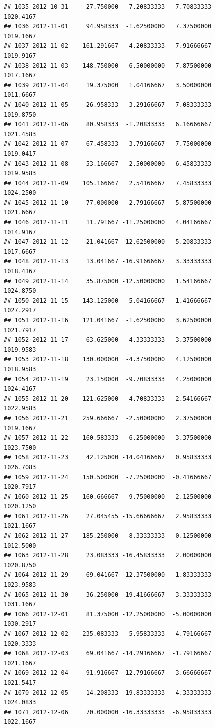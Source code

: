\documentclass[
]{article}
\begin{document}
\begin{verbatim}
## 1035 2012-10-31     27.750000  -7.20833333   7.70833333    1020.4167
## 1036 2012-11-01     94.958333  -1.62500000   7.37500000    1019.1667
## 1037 2012-11-02    161.291667   4.20833333   7.91666667    1019.9167
## 1038 2012-11-03    148.750000   6.50000000   7.87500000    1017.1667
## 1039 2012-11-04     19.375000   1.04166667   3.50000000    1011.6667
## 1040 2012-11-05     26.958333  -3.29166667   7.08333333    1019.8750
## 1041 2012-11-06     80.958333  -1.20833333   6.16666667    1021.4583
## 1042 2012-11-07     67.458333  -3.79166667   7.75000000    1019.0417
## 1043 2012-11-08     53.166667  -2.50000000   6.45833333    1019.9583
## 1044 2012-11-09    105.166667   2.54166667   7.45833333    1024.2500
## 1045 2012-11-10     77.000000   2.79166667   5.87500000    1021.6667
## 1046 2012-11-11     11.791667 -11.25000000   4.04166667    1014.9167
## 1047 2012-11-12     21.041667 -12.62500000   5.20833333    1017.6667
## 1048 2012-11-13     13.041667 -16.91666667   3.33333333    1018.4167
## 1049 2012-11-14     35.875000 -12.50000000   1.54166667    1024.8750
## 1050 2012-11-15    143.125000  -5.04166667   1.41666667    1027.2917
## 1051 2012-11-16    121.041667  -1.62500000   3.62500000    1021.7917
## 1052 2012-11-17     63.625000  -4.33333333   3.37500000    1019.9583
## 1053 2012-11-18    130.000000  -4.37500000   4.12500000    1018.9583
## 1054 2012-11-19     23.150000  -9.70833333   4.25000000    1024.4167
## 1055 2012-11-20    121.625000  -4.70833333   2.54166667    1022.9583
## 1056 2012-11-21    259.666667  -2.50000000   2.37500000    1019.1667
## 1057 2012-11-22    160.583333  -6.25000000   3.37500000    1023.7500
## 1058 2012-11-23     42.125000 -14.04166667   0.95833333    1026.7083
## 1059 2012-11-24    150.500000  -7.25000000  -0.41666667    1020.7917
## 1060 2012-11-25    160.666667  -9.75000000   2.12500000    1020.1250
## 1061 2012-11-26     27.045455 -15.66666667   2.95833333    1021.1667
## 1062 2012-11-27    185.250000  -8.33333333   0.12500000    1012.5000
## 1063 2012-11-28     23.083333 -16.45833333   2.00000000    1020.8750
## 1064 2012-11-29     69.041667 -12.37500000  -1.83333333    1023.9583
## 1065 2012-11-30     36.250000 -19.41666667  -3.33333333    1031.1667
## 1066 2012-12-01     81.375000 -12.25000000  -5.00000000    1030.2917
## 1067 2012-12-02    235.083333  -5.95833333  -4.79166667    1020.3333
## 1068 2012-12-03     69.041667 -14.29166667  -1.79166667    1021.1667
## 1069 2012-12-04     91.916667 -12.79166667  -3.66666667    1021.5417
## 1070 2012-12-05     14.208333 -19.83333333  -4.33333333    1024.0833
## 1071 2012-12-06     70.000000 -16.33333333  -6.95833333    1022.1667

\end{verbatim}
\end{document}
